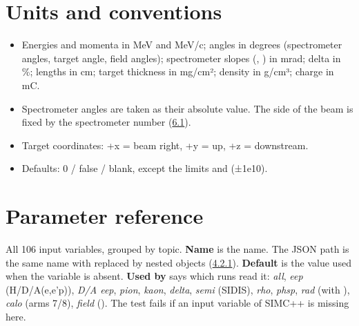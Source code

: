 \section{\texorpdfstring{Units and conventions}{Units and conventions}}\label{user_manual-04u5finputs:45-units-and-conventions}
\begin{itemize}
\item Energies and momenta in MeV and MeV/c; angles in degrees (spectrometer angles, target angle, field angles);
spectrometer slopes (, ) in mrad; delta in \%; lengths in cm; target thickness in mg/cm²; density in
g/cm³; charge in mC.
\item Spectrometer angles are taken as their absolute value. The side of the beam is fixed by the spectrometer number
(\hyperref[user_manual-06u5fspectrometers:61-spectrometer-numbers]{6.1}).
\item Target coordinates: +x = beam right, +y = up, +z = downstream.
\item Defaults: 0 / false / blank, except the  limits and  (±1e10).
\end{itemize}
\section{\texorpdfstring{Parameter reference}{Parameter reference}}\label{user_manual-04u5finputs:46-parameter-reference}
All 106 input variables, grouped by topic. \textbf{Name} is the  name. The JSON path is the same name with \code{\%} replaced
by nested objects (\hyperref[user_manual-04u5finputs:421-parameters]{4.2.1}). \textbf{Default} is the value used when the variable is absent. \textbf{Used by}
says which runs read it: \emph{all}, \emph{eep} (H/\allowbreak{}D/\allowbreak{}A(e,\allowbreak{}e'p)),\allowbreak{} \emph{D/A eep}, \emph{pion}, \emph{kaon}, \emph{delta}, \emph{semi} (SIDIS), \emph{rho},
\emph{phsp}, \emph{rad} (with \hyperref[param:usingu5frad]{}), \emph{calo} (arms 7/8), \emph{field} (\hyperref[param:usingu5ftgtu5ffield]{}). The test
 fails if an input variable of SIMC++ is missing here.

